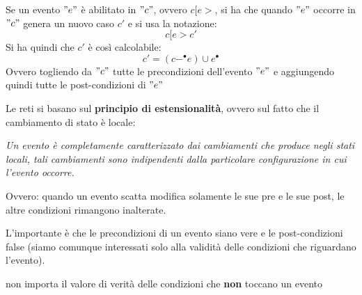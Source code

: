 \begin{definizione}
  Se un evento $"e"$ è abilitato in $"c"$, ovvero $c[e >$, si ha che quando $"e"$
  occorre in $"c"$ genera un nuovo caso $c'$ e si usa la notazione:
  \[c[e > c'\]
  Si ha quindi che $c'$ è così calcolabile:
  \[c'=(c-^\bullet e)\cup e^\bullet\]
  Ovvero togliendo da $"c"$ tutte le precondizioni dell'evento $"e"$ e aggiungendo
  quindi tutte le post-condizioni di $"e"$
\end{definizione} \vspace{5mm} %
\begin{definizione}
  Le reti si basano sul \textbf{principio di estensionalità}, ovvero sul fatto che
il cambiamento di stato è locale:
\begin{center}
  \textit{Un evento è completamente caratterizzato dai cambiamenti che produce
    negli stati locali, tali cambiamenti sono indipendenti dalla particolare
    configurazione in cui l’evento occorre.}
\end{center}
Ovvero: quando
un evento scatta modifica solamente le sue pre e le sue post, le altre condizioni rimangono
inalterate.
\end{definizione} \vspace{5mm} %
L'importante è che le precondizioni di un evento siano vere e le post-condizioni
false (siamo comunque interessati solo alla validità delle condizioni che
riguardano l'evento).
\begin{nota}
non importa il valore di verità delle condizioni che \textbf{non} toccano un evento
\end{nota}
